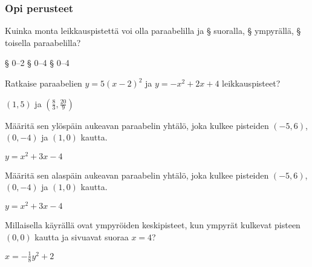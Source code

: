 \begin{tehtavasivu}

\subsubsection*{Opi perusteet}

\begin{tehtava}
    Kuinka monta leikkauspistettä voi olla paraabelilla ja
    \alakohdat
        § suoralla,
        § ympyrällä,
        § toisella paraabelilla?
    \loppu
    \begin{vastaus}
        \alakohdat
            § 0--2
            § 0--4
            § 0--4
        \loppu
    \end{vastaus}
\end{tehtava}

\begin{tehtava}
Ratkaise paraabelien $y=5(x-2)^2$  ja $y=-x^2+2x+4$ leikkauspisteet?
\begin{vastaus}
$(1, 5)$ ja $(\frac{8}{3}, \frac{20}{9})$
\end{vastaus}
\end{tehtava}

\begin{tehtava}
Määritä sen ylöspäin aukeavan paraabelin yhtälö, joka kulkee pisteiden $(-5, 6)$, $(0, -4)$ ja $(1, 0)$ kautta.
\begin{vastaus}
$y= x^2+3x-4$
\end{vastaus}
\end{tehtava}

\begin{tehtava}
Määritä sen alaspäin aukeavan paraabelin yhtälö, joka kulkee pisteiden $(-5, 6)$, $(0, -4)$ ja $(1, 0)$ kautta.
\begin{vastaus}
$y= x^2+3x-4$
\end{vastaus}
\end{tehtava}

\begin{tehtava}
Millaisella käyrällä ovat ympyröiden keskipisteet, kun ympyrät kulkevat pisteen $(0, 0)$ kautta ja sivuavat suoraa $x=4$?
\begin{vastaus}
$x=-\frac{1}{8}y^2+2$
\end{vastaus}
\end{tehtava}


\end{tehtavasivu}
